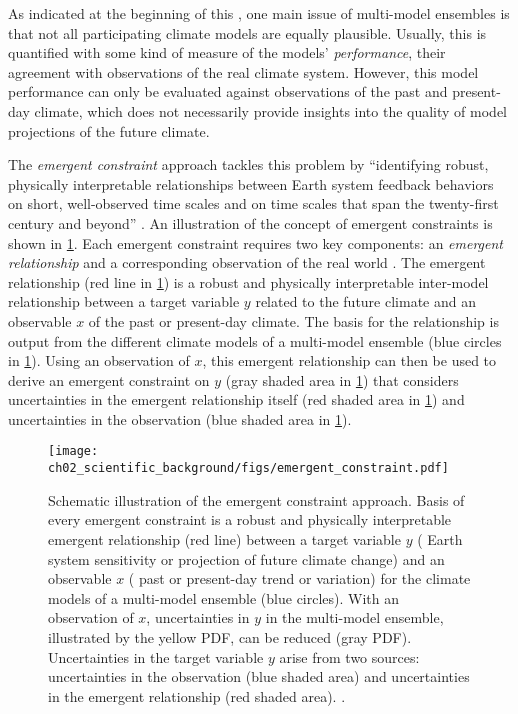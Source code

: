 As indicated at the beginning of this
, one main issue of multi-model
ensembles is that not all participating climate models are equally plausible.
Usually, this is quantified with some kind of measure of the models'
\emph{performance}, \ie{} their agreement with observations of the real climate
system. However, this model performance can only be evaluated against
observations of the past and present-day climate, which does not necessarily
provide insights into the quality of model projections of the future climate.

The \emph{emergent constraint} approach tackles this problem by
\enquote{identifying robust, physically interpretable relationships between
  Earth system feedback behaviors on short, well-observed time scales and on
  time scales that span the twenty-first century and beyond}
\autocite{Eyring2019}. An illustration of the concept of emergent constraints
is shown in \cref{fig:02:emergent_constraint}. Each emergent constraint
requires two key components: an \emph{emergent relationship} and a
corresponding observation of the real world \autocite{Eyring2019}. The
emergent relationship (red line in \cref{fig:02:emergent_constraint}) is a
robust and physically interpretable inter-model relationship between a target
variable $y$ related to the future climate and an observable $x$ of the past
or present-day climate. The basis for the relationship is output from the
different climate models of a multi-model ensemble (blue circles in
\cref{fig:02:emergent_constraint}). Using an observation of $x$, this
emergent relationship can then be used to derive an emergent constraint on
$y$ (gray shaded area in \cref{fig:02:emergent_constraint}) that considers
uncertainties in the emergent relationship itself (red shaded area in
\cref{fig:02:emergent_constraint}) and uncertainties in the observation (blue
shaded area in \cref{fig:02:emergent_constraint}).

\begin{figure}[t]
  \centering
  \texttt{[image: 
    ch02\_scientific\_background/figs/emergent\_constraint.pdf]}
  \caption[
    Schematic illustration of the emergent constraint approach.
  ]{
    Schematic illustration of the emergent constraint approach. Basis of every
    emergent constraint is a robust and physically interpretable emergent
    relationship (red line) between a target variable $y$ (\eg{} Earth system
    sensitivity or projection of future climate change) and an observable $x$
    (\eg{} past or present-day trend or variation) for the climate models of a
    multi-model ensemble (blue circles). With an observation of $x$,
    uncertainties in $y$ in the multi-model ensemble, illustrated by the yellow
    \acf{PDF}, can be reduced (gray \acs{PDF}). Uncertainties in the target
    variable $y$ arise from two sources: uncertainties in the observation (blue
    shaded area) and uncertainties in the emergent relationship (red shaded
    area). .
  }
  \label{fig:02:emergent_constraint}
\end{figure}

